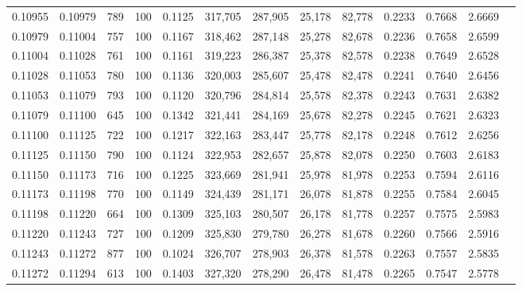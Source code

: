 \begin{tabular}{rrrrrrrrrrrrr}
0.10955 & 0.10979 &   789 & 100 &                                     0.1125 & 317,705 & 287,905 &  25,178 &  82,778 & 0.2233 & 0.7668 & 2.6669 \\
0.10979 & 0.11004 &   757 & 100 &                                     0.1167 & 318,462 & 287,148 &  25,278 &  82,678 & 0.2236 & 0.7658 & 2.6599 \\
0.11004 & 0.11028 &   761 & 100 &                                     0.1161 & 319,223 & 286,387 &  25,378 &  82,578 & 0.2238 & 0.7649 & 2.6528 \\
0.11028 & 0.11053 &   780 & 100 &                                     0.1136 & 320,003 & 285,607 &  25,478 &  82,478 & 0.2241 & 0.7640 & 2.6456 \\
0.11053 & 0.11079 &   793 & 100 &                                     0.1120 & 320,796 & 284,814 &  25,578 &  82,378 & 0.2243 & 0.7631 & 2.6382 \\
0.11079 & 0.11100 &   645 & 100 &                                     0.1342 & 321,441 & 284,169 &  25,678 &  82,278 & 0.2245 & 0.7621 & 2.6323 \\
0.11100 & 0.11125 &   722 & 100 &                                     0.1217 & 322,163 & 283,447 &  25,778 &  82,178 & 0.2248 & 0.7612 & 2.6256 \\
0.11125 & 0.11150 &   790 & 100 &                                     0.1124 & 322,953 & 282,657 &  25,878 &  82,078 & 0.2250 & 0.7603 & 2.6183 \\
0.11150 & 0.11173 &   716 & 100 &                                     0.1225 & 323,669 & 281,941 &  25,978 &  81,978 & 0.2253 & 0.7594 & 2.6116 \\
0.11173 & 0.11198 &   770 & 100 &                                     0.1149 & 324,439 & 281,171 &  26,078 &  81,878 & 0.2255 & 0.7584 & 2.6045 \\
0.11198 & 0.11220 &   664 & 100 &                                     0.1309 & 325,103 & 280,507 &  26,178 &  81,778 & 0.2257 & 0.7575 & 2.5983 \\
0.11220 & 0.11243 &   727 & 100 &                                     0.1209 & 325,830 & 279,780 &  26,278 &  81,678 & 0.2260 & 0.7566 & 2.5916 \\
0.11243 & 0.11272 &   877 & 100 &                                     0.1024 & 326,707 & 278,903 &  26,378 &  81,578 & 0.2263 & 0.7557 & 2.5835 \\
0.11272 & 0.11294 &   613 & 100 &                                     0.1403 & 327,320 & 278,290 &  26,478 &  81,478 & 0.2265 & 0.7547 & 2.5778 \\

\end{tabular}
